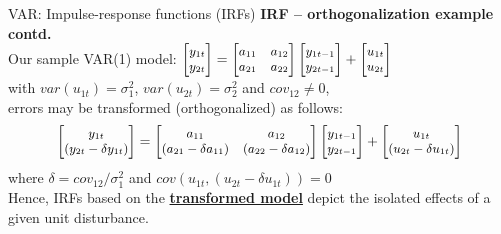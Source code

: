 \documentclass[usenames,dvipsnames]{beamer}
\begin{document}
\begin{frame}{VAR: Impulse-response functions (IRFs)}
\textbf{IRF – orthogonalization example contd.}\\
\bigskip
Our sample VAR(1) model: $ {\small \begin{bmatrix}
y_{1t} \\
y_{2t} \\
\end{bmatrix}
=
\begin{bmatrix}
a_{11} & a_{12} \\
a_{21} & a_{22} \\
\end{bmatrix}
\begin{bmatrix}
y_{1t-1} \\
y_{2t-1} \\
\end{bmatrix}
+
\begin{bmatrix}
u_{1t} \\
u_{2t} \\
\end{bmatrix}}$ \\
\medskip
with $\textit{var}(u_{1t}) = \sigma_1^2$, $\textit{var}(u_{2t}) = \sigma_2^2$ and $\textit{cov}_{12} \neq 0$, \\ errors may be transformed (orthogonalized) as follows: 
\begin{align*}
{\small 
\begin{bmatrix}
y_{1t} \\
(y_{2t} - \delta y_{1t}) \\
\end{bmatrix}
=
\begin{bmatrix}
a_{11} & a_{12} \\
(a_{21} - \delta a_{11}) & (a_{22} - \delta a_{12})\\
\end{bmatrix}
\begin{bmatrix}
y_{1t-1} \\
y_{2t-1} \\
\end{bmatrix}
+
\begin{bmatrix}
u_{1t} \\
(u_{2t} - \delta u_{1t}) \\
\end{bmatrix}}
\end{align*}
where $\delta = \textit{cov}_{12}/\sigma_1^2$ \quad and \quad $\textit{cov}(u_{1t}, (u_{2t} - \delta u_{1t})) = 0$ \\
\bigskip
Hence, IRFs based on the \underline{\textbf{transformed model}} depict the isolated effects of a given unit disturbance.
\end{frame}
\end{document}
